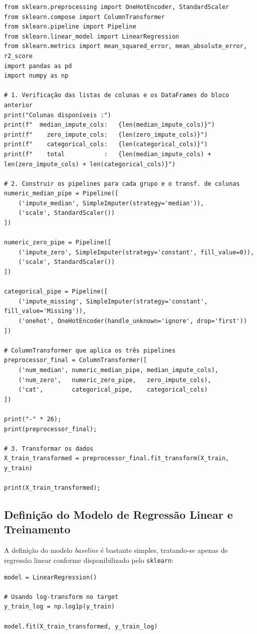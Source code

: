 \documentclass[11pt]{article}
\begin{document}
\begin{verbatim}
from sklearn.preprocessing import OneHotEncoder, StandardScaler
from sklearn.compose import ColumnTransformer
from sklearn.pipeline import Pipeline
from sklearn.linear_model import LinearRegression
from sklearn.metrics import mean_squared_error, mean_absolute_error, r2_score
import pandas as pd
import numpy as np

# 1. Verificação das listas de colunas e os DataFrames do bloco anterior
print("Colunas disponíveis :")
print(f"  median_impute_cols:   {len(median_impute_cols)}")
print(f"    zero_impute_cols:   {len(zero_impute_cols)}")
print(f"    categorical_cols:   {len(categorical_cols)}")
print(f"    total           :   {len(median_impute_cols) + len(zero_impute_cols) + len(categorical_cols)}")

# 2. Construir os pipelines para cada grupo e o transf. de colunas
numeric_median_pipe = Pipeline([
    ('impute_median', SimpleImputer(strategy='median')),
    ('scale', StandardScaler())
])

numeric_zero_pipe = Pipeline([
    ('impute_zero', SimpleImputer(strategy='constant', fill_value=0)),
    ('scale', StandardScaler())
])

categorical_pipe = Pipeline([
    ('impute_missing', SimpleImputer(strategy='constant', fill_value='Missing')),
    ('onehot', OneHotEncoder(handle_unknown='ignore', drop='first'))
])

# ColumnTransformer que aplica os três pipelines
preprocessor_final = ColumnTransformer([
    ('num_median', numeric_median_pipe, median_impute_cols),
    ('num_zero',   numeric_zero_pipe,   zero_impute_cols),
    ('cat',        categorical_pipe,    categorical_cols)
])

print("-" * 26);
print(preprocessor_final);

# 3. Transformar os dados
X_train_transformed = preprocessor_final.fit_transform(X_train, y_train)

print(X_train_transformed);
\end{verbatim}
\subsection{Definição do Modelo de Regressão Linear e Treinamento}
\label{sec:org5564d96}
A definição do modelo \emph{baseline} é bastante simples, tratando-se apenas de regressão linear conforme disponibilizado pelo \texttt{sklearn}:

\begin{verbatim}
model = LinearRegression()

# Usando log-transform no target
y_train_log = np.log1p(y_train)

model.fit(X_train_transformed, y_train_log)
\end{verbatim}
\end{document}
